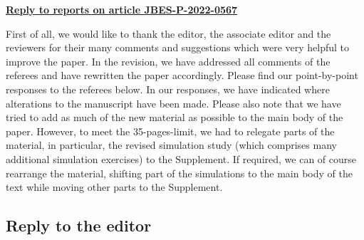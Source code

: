 \documentclass[a4paper,12pt]{article}
\begin{document}
\begin{center}
\underline{\Large\textbf{{Reply to reports on article JBES-P-2022-0567}}}\end{center}
\vspace{10pt}


First of all, we would like to thank the editor, the associate editor and the reviewers for their many comments and suggestions which were very helpful to improve the paper. In the revision, we have addressed all comments of the referees and have rewritten the paper accordingly. Please find our point-by-point responses to the referees below. In our responses, we have indicated where alterations to the manuscript have been made. Please also note that we have tried to add as much of the new material as possible to the main body of the paper. However, to meet the 35-pages-limit, we had to relegate parts of the material, in particular, the revised simulation study (which comprises many additional simulation exercises) to the Supplement. If required, we can of course rearrange the material, shifting part of the simulations to the main body of the text while moving other parts to the Supplement. 



\subsection*{Reply to the editor}
\end{document}
